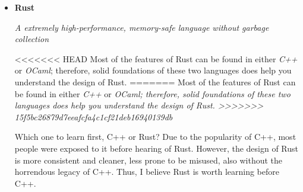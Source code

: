 \documentclass{article}
\begin{document}
\begin{itemize}
    \item \textbf{Rust}
    
    \emph{A extremely high-performance, memory-safe language without garbage collection}
    
<<<<<<< HEAD
    Most of the features of Rust can be found in either \emph{C++} or \emph{OCaml}; therefore, solid foundations of these two languages does help you understand the design of Rust.
=======
    Most of the features of Rust can be found in either \emph{C++} or \em{OCaml}; therefore, solid foundations of these two languages does help you understand the design of Rust.
>>>>>>> 15f5bc26879d7eeafcfa4c1cf21deb16940139db
    
    Which one to learn first, C++ or Rust?
    Due to the popularity of C++, most people were exposed to it before hearing of Rust.
    However, the design of Rust is more consistent and cleaner, less prone to be misused, also without the horrendous legacy of C++.
    Thus, I believe Rust is worth learning before C++.
    

\end{itemize}
\end{document}
